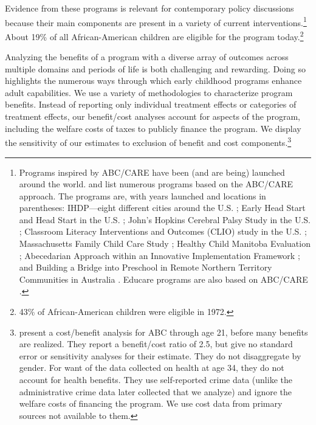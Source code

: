 Evidence from these programs is relevant for contemporary policy discussions because their main components are present in a variety of current interventions.\footnote{Programs inspired by ABC/CARE have been (and are being) launched around the world. \citet{Sparling_2010_Highlights} and \citet{Ramey_Ramey_Lanzi_2014_Interventions} list numerous programs based on the ABC/CARE approach. The programs are, with years launched and locations in parentheses: IHDP---eight different cities around the U.S. \citep{Spiker-etal_1997_Helping}; Early Head Start and Head Start in the U.S. \citep{Schneider_McDonald-eds_2007_Scale-Up_Vol-1}; John's Hopkins Cerebral Palsy Study in the U.S. \citep{Sparling_2010_Highlights}; Classroom Literacy Interventions and Outcomes (CLIO) study in the U.S. \citep{Sparling_2010_Highlights}; Massachusetts Family Child Care Study \citep{Collins_etal_2010_Massachusetts-Study}; Healthy Child Manitoba Evaluation \citep{Healthy_Child_Manitoba_2015_Starting-Early}; Abecedarian Approach within an Innovative Implementation Framework \citep{Jensen_Nielsen_2016_ABC-Programme-Pilot}; and Building a Bridge into Preschool in Remote Northern Territory Communities in Australia \citep{UMonash_Dataset_2015_URL}. Educare programs are also based on ABC/CARE \citep{Educare_2014_Research_Agenda,Yazejian_Bryant_2012_Educare}.} About 19\% of all African-American children are eligible for the program today.\footnote{43\% of African-American children were eligible in 1972.}

Analyzing the benefits of a program with a diverse array of outcomes across multiple domains and periods of life is both challenging and rewarding. Doing so highlights the numerous ways through which early childhood programs enhance adult capabilities. We use a variety of methodologies to characterize program benefits. Instead of reporting only individual treatment effects or categories of treatment effects, our benefit/cost analyses account for aspects of the program, including the welfare costs of taxes to publicly finance the program. We display the sensitivity of our estimates to exclusion of benefit and cost components.\footnote{\cite{Barnett_Masse_2002_benefitcost,Barnett_Masse_2007_EER} present a cost/benefit analysis for ABC through age 21, before many benefits are realized. They report a benefit/cost ratio of 2.5, but give no standard error or sensitivity analyses for their estimate. They do not disaggregate by gender. For want of the data collected on health at age 34, they do not account for health benefits. They use self-reported crime data (unlike the administrative crime data later collected that we analyze) and ignore the welfare costs of financing the program. We use cost data from primary sources not available to them.}

